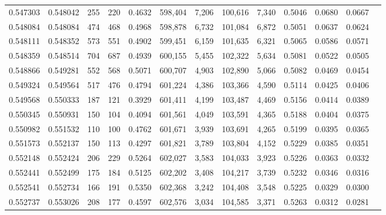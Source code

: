 \begin{tabular}{rrrrrrrrrrrrr}
0.547303 & 0.548042 &   255 &   220 &                                     0.4632 & 598,404 &   7,206 & 100,616 &   7,340 & 0.5046 & 0.0680 & 0.0667 \\
0.548084 & 0.548084 &   474 &   468 &                                     0.4968 & 598,878 &   6,732 & 101,084 &   6,872 & 0.5051 & 0.0637 & 0.0624 \\
0.548111 & 0.548352 &   573 &   551 &                                     0.4902 & 599,451 &   6,159 & 101,635 &   6,321 & 0.5065 & 0.0586 & 0.0571 \\
0.548359 & 0.548514 &   704 &   687 &                                     0.4939 & 600,155 &   5,455 & 102,322 &   5,634 & 0.5081 & 0.0522 & 0.0505 \\
0.548866 & 0.549281 &   552 &   568 &                                     0.5071 & 600,707 &   4,903 & 102,890 &   5,066 & 0.5082 & 0.0469 & 0.0454 \\
0.549324 & 0.549564 &   517 &   476 &                                     0.4794 & 601,224 &   4,386 & 103,366 &   4,590 & 0.5114 & 0.0425 & 0.0406 \\
0.549568 & 0.550333 &   187 &   121 &                                     0.3929 & 601,411 &   4,199 & 103,487 &   4,469 & 0.5156 & 0.0414 & 0.0389 \\
0.550345 & 0.550931 &   150 &   104 &                                     0.4094 & 601,561 &   4,049 & 103,591 &   4,365 & 0.5188 & 0.0404 & 0.0375 \\
0.550982 & 0.551532 &   110 &   100 &                                     0.4762 & 601,671 &   3,939 & 103,691 &   4,265 & 0.5199 & 0.0395 & 0.0365 \\
0.551573 & 0.552137 &   150 &   113 &                                     0.4297 & 601,821 &   3,789 & 103,804 &   4,152 & 0.5229 & 0.0385 & 0.0351 \\
0.552148 & 0.552424 &   206 &   229 &                                     0.5264 & 602,027 &   3,583 & 104,033 &   3,923 & 0.5226 & 0.0363 & 0.0332 \\
0.552441 & 0.552499 &   175 &   184 &                                     0.5125 & 602,202 &   3,408 & 104,217 &   3,739 & 0.5232 & 0.0346 & 0.0316 \\
0.552541 & 0.552734 &   166 &   191 &                                     0.5350 & 602,368 &   3,242 & 104,408 &   3,548 & 0.5225 & 0.0329 & 0.0300 \\
0.552737 & 0.553026 &   208 &   177 &                                     0.4597 & 602,576 &   3,034 & 104,585 &   3,371 & 0.5263 & 0.0312 & 0.0281 \\

\end{tabular}
